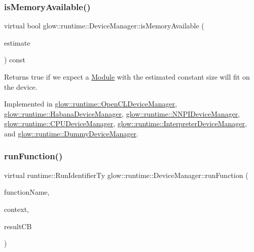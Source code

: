 \subsubsection{\texorpdfstring{is\+Memory\+Available()}{isMemoryAvailable()}}
{\footnotesize\ttfamily virtual bool glow\+::runtime\+::\+Device\+Manager\+::is\+Memory\+Available (\begin{DoxyParamCaption}\item[{uint64\+\_\+t}]{estimate }\end{DoxyParamCaption}) const\hspace{0.3cm}{\ttfamily [pure virtual]}}

\begin{DoxyReturn}{Returns}
true if we expect a \hyperlink{classglow_1_1_module}{Module} with the estimated constant size will fit on the device. 
\end{DoxyReturn}


Implemented in \hyperlink{classglow_1_1runtime_1_1_open_c_l_device_manager_ab94967240f9d1ef5ae26f3a242488809}{glow\+::runtime\+::\+Open\+C\+L\+Device\+Manager}, \hyperlink{classglow_1_1runtime_1_1_habana_device_manager_aadaab8c13097bb7ec64b219874549c7f}{glow\+::runtime\+::\+Habana\+Device\+Manager}, \hyperlink{classglow_1_1runtime_1_1_n_n_p_i_device_manager_a543e27b561eef6581859d844565c1ac1}{glow\+::runtime\+::\+N\+N\+P\+I\+Device\+Manager}, \hyperlink{classglow_1_1runtime_1_1_c_p_u_device_manager_a61e188ea68529ec4a4037e7df81f98f8}{glow\+::runtime\+::\+C\+P\+U\+Device\+Manager}, \hyperlink{classglow_1_1runtime_1_1_interpreter_device_manager_a04615e8203b6f581e8646f631346418a}{glow\+::runtime\+::\+Interpreter\+Device\+Manager}, and \hyperlink{classglow_1_1runtime_1_1_dummy_device_manager_a51b1549661977f06447122f0529d8b14}{glow\+::runtime\+::\+Dummy\+Device\+Manager}.

\mbox{\label{classglow_1_1runtime_1_1_device_manager_ac182cdf6ed9f6903c11fa71c0446d1f7}} 
\subsubsection{\texorpdfstring{run\+Function()}{runFunction()}}
{\footnotesize\ttfamily virtual runtime\+::\+Run\+Identifier\+Ty glow\+::runtime\+::\+Device\+Manager\+::run\+Function (\begin{DoxyParamCaption}\item[{std\+::string}]{function\+Name,  }\item[{std\+::unique\+\_\+ptr$<$ \hyperlink{classglow_1_1_execution_context}{Execution\+Context} $>$}]{context,  }\item[{runtime\+::\+Result\+C\+B\+Ty}]{result\+CB }\end{DoxyParamCaption})\hspace{0.3cm}{\ttfamily [pure virtual]}}

